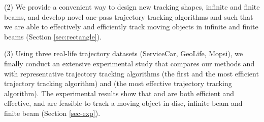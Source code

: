 \ni (2) We provide a convenient way to design new tracking shapes, \ie  infinite and finite beams, and develop novel one-pass trajectory tracking algorithms \sitt and \bitt such that we are able to effectively and efficiently track moving objects in infinite and finite beams (Section \ref{sec:rectangle}). 

\ni (3) Using three real-life trajectory datasets (ServiceCar, GeoLife, Mopsi), we finally conduct an extensive experimental study that compares our methods \citt and \bitt with representative trajectory tracking algorithms \ldrh (the first and the most efficient trajectory tracking algorithm) and \grts (the most effective trajectory tracking algorithm). The experimental results show that \citt and \bitt are both efficient and effective, and are feasible to track a moving object in disc, infinite beam and finite beam (Section \ref{sec-exp}).




